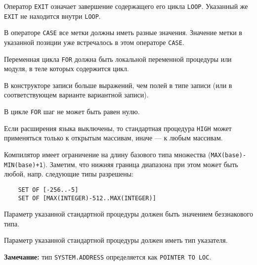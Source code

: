 
Оператор \verb'EXIT' означает завершение содержащего его цикла
\verb'LOOP'.
Указанный же \verb'EXIT' не находится внутри \verb'LOOP'.


В операторе \verb'CASE' все метки должны иметь разные значения.
Значение метки в указанной позиции уже встречалось
в этом операторе \verb'CASE'.


Переменная цикла \verb'FOR' должна быть локальной переменной процедуры
или модуля, в теле которых содержится цикл.


В конструкторе записи больше выражений, чем полей в типе записи
(или в соответствующем варианте вариантной записи).


В цикле \verb'FOR' шаг не может быть равен нулю.


Если расширения языка выключены, то стандартная процедура
\verb'HIGH' может применяться только к открытым массивам,
иначе --- к любым массивам.


Компилятор имеет ограничение на длину базового типа множества
(\verb'MAX(base)-MIN(base)+1'). Заметим, что нижняя граница диапазона
при этом может быть любой, напр. следующие типы разрешены:

\verb'    SET OF [-256..-5]'\\
\verb'    SET OF [MAX(INTEGER)-512..MAX(INTEGER)]'


Параметр указанной стандартной процедуры должен быть значением
беззнакового типа.


Параметр указанной стандартной процедуры должен иметь тип указателя.

{\bf Замечание:} тип  \verb'SYSTEM.ADDRESS' определяется как
\verb'POINTER TO LOC'.


